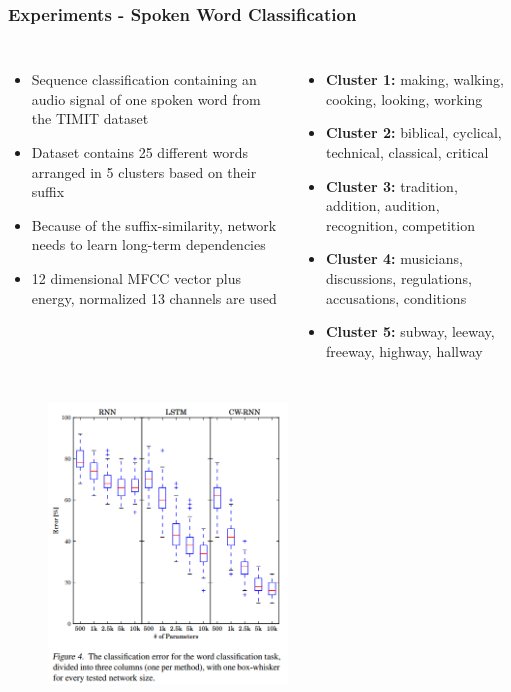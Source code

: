 \documentclass{beamer}
\begin{document}
{
   \frametitle{Experiments - Spoken Word Classification}
   \begin{columns}
		\begin{itemize}		
			\item Sequence classification containing an audio signal of one spoken word from the TIMIT dataset  
			\item Dataset contains 25 different words arranged in 5 clusters based on their suffix 
			\item Because of the suffix-similarity, network needs to learn long-term dependencies
			\item 12 dimensional MFCC vector plus energy, normalized 13 channels are used
		\end{itemize}
		\begin{itemize}
			\item \textbf{Cluster 1:} making, walking, cooking, looking, working
			\item \textbf{Cluster 2:} biblical, cyclical, technical, classical, critical
			\item \textbf{Cluster 3:} tradition, addition, audition, recognition, competition
			\item \textbf{Cluster 4:} musicians, discussions, regulations, accusations, conditions
			\item \textbf{Cluster 5:} subway, leeway, freeway, highway, hallway
		\end{itemize}		
	\end{columns}
}
\frame
{
	\begin{figure}[ht]  
		\begin{center}
			\includegraphics[width=2.5in]{Images/cwrnn_word_classification.png}   
		\end{center}   
	\end{figure}
}
\end{document}
